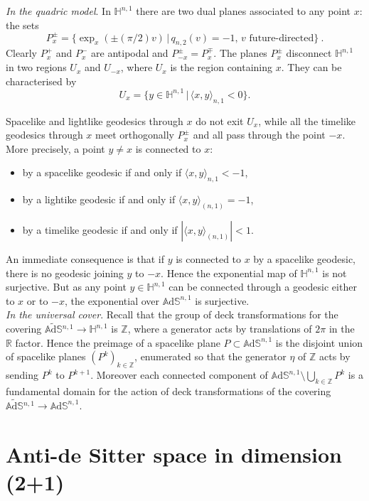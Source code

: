 \documentclass[10pt,a4paper,oneside,reqno]{book}
\def\R{\mathbb{R}}
\def\Z{\mathbb{Z}}
\def\H{\mathbb{H}}
\def\A{\mathbb{A}\mathrm{d}\mathbb{S}}
\def\AS{\widetilde{\mathbb{A}\mathrm{d}\mathbb{S}}{}}
\theoremstyle{plain}
\theoremstyle{definition}
\theoremstyle{plain}
\theoremstyle{plain}
\theoremstyle{mystyleNormalFont}
\begin{document}
\noindent\textit{In the quadric model}. In $\H^{n,1}$ there are two dual planes associated to any point $x$: the sets 
\[
P_{x}^\pm=\{\exp_{x}(\pm(\pi/2)v)\,|\,q_{n,2}(v)=-1,\,v\text{ future-directed}\}~.
\]
Clearly $P_{x}^+$ and $P_{x}^{-} $ are antipodal and  $P_{-x}^\pm=P_{x}^\mp$. The planes $P_x^{\pm}$ disconnect $\H^{n,1}$ in two regions $U_x$ and
$U_{-x}$, where $U_{x}$ is the region containing $x$. They can be characterised by 
\[
U_{x}=\{y\in\H^{n,1}\,|\,\langle x, y\rangle_{n,1}<0\}.
\]

Spacelike and lightlike geodesics through $x$ do not exit $U_{x}$, 
while all the timelike geodesics through $x$ meet orthogonally $P^{\pm}_x$ and all pass through the point $-x$.
More precisely, a point $y\neq x$ is connected to $x$:
\begin{itemize}
\item by a spacelike geodesic if and only if $\langle x,y\rangle_{n,1}<-1$,
\item by a lightike geodesic if and only if $\langle x,y\rangle_{(n,1)}=-1$,
\item by a timelike geodesic if and only if 
$|\langle x,y\rangle_{(n,1)}|<1$.
\end{itemize}
An immediate consequence is that if $y$ is connected to $x$ by a spacelike geodesic, there is no geodesic joining $y$ to $-x$.
Hence the exponential map of $\H^{n,1}$ is not surjective. But as any point $y\in\H^{n,1}$ can be connected through a geodesic either to $x$ or to $-x$,
the exponential over $\A^{n,1}$ is surjective.\\

\noindent\textit{In the universal cover}.
Recall that the group of deck transformations for the covering $\AS^{n,1} \to \H^{n,1}$ is $\Z$, where a generator acts by translations of $2\pi$ in the $\R$ factor. Hence the  preimage of a spacelike plane $P\subset\A^{n,1}$ is the disjoint union of spacelike planes $(P^k)_{k\in\Z}$, enumerated so that the generator $\eta$ of $\Z$ acts by sending $P^k$ to $P^{k+1}$.
Moreover each connected component of $\A^{n,1}\setminus\bigcup_{k\in\Z}P^k$ is a fundamental  domain for the action of deck transformations of the covering $\AS^{n,1}\to\A^{n,1}$.

\chapter{Anti-de Sitter space in dimension (2+1)} \label{chapter:3}
\end{document}
